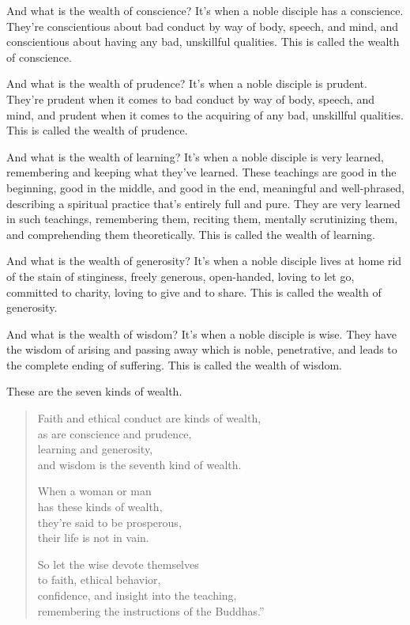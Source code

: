 \documentclass[12pt,openany]{book}%
\begin{document}
And what is the wealth of conscience? It’s when a noble disciple has a conscience. They’re conscientious about bad conduct by way of body, speech, and mind, and conscientious about having any bad, unskillful qualities. This is called the wealth of conscience. 

And what is the wealth of prudence? It’s when a noble disciple is prudent. They’re prudent when it comes to bad conduct by way of body, speech, and mind, and prudent when it comes to the acquiring of any bad, unskillful qualities. This is called the wealth of prudence. 

And what is the wealth of learning? It’s when a noble disciple is very learned, remembering and keeping what they’ve learned. These teachings are good in the beginning, good in the middle, and good in the end, meaningful and well-phrased, describing a spiritual practice that’s entirely full and pure. They are very learned in such teachings, remembering them, reciting them, mentally scrutinizing them, and comprehending them theoretically. This is called the wealth of learning. 

And what is the wealth of generosity? It’s when a noble disciple lives at home rid of the stain of stinginess, freely generous, open-handed, loving to let go, committed to charity, loving to give and to share. This is called the wealth of generosity. 

And what is the wealth of wisdom? It’s when a noble disciple is wise. They have the wisdom of arising and passing away which is noble, penetrative, and leads to the complete ending of suffering. This is called the wealth of wisdom. 

These are the seven kinds of wealth. 

\begin{verse}%
Faith and ethical conduct are kinds of wealth, \\
as are conscience and prudence, \\
learning and generosity, \\
and wisdom is the seventh kind of wealth. 

When a woman or man \\
has these kinds of wealth, \\
they’re said to be prosperous, \\
their life is not in vain. 

So let the wise devote themselves \\
to faith, ethical behavior, \\
confidence, and insight into the teaching, \\
remembering the instructions of the Buddhas.” 

%
\end{verse}
\end{document}

